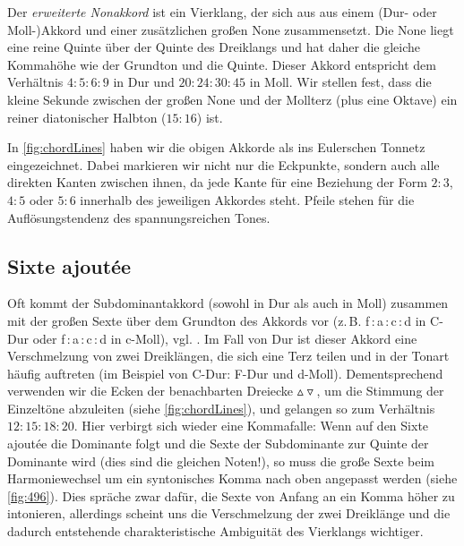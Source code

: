 Der \emph{erweiterte Nonakkord} ist ein Vierklang, der sich aus aus einem (Dur-
oder Moll-)Akkord und einer zusätzlichen großen None zusammensetzt.  Die None
liegt eine reine Quinte über der Quinte des Dreiklangs und hat daher die gleiche
Kommahöhe wie der Grundton und die Quinte. Dieser
Akkord entspricht dem Verhältnis $4:5:6:9$ in Dur und $20:24:30:45$ in Moll. Wir
stellen fest, dass die kleine Sekunde zwischen der großen None und der Mollterz
(plus eine Oktave) ein reiner diatonischer Halbton ($15:16$) ist.

In \cref{fig:chordLines} haben wir die obigen Akkorde als ins Eulerschen Tonnetz
eingezeichnet. Dabei markieren wir nicht nur die Eckpunkte, sondern auch alle
direkten Kanten zwischen ihnen, da jede Kante für eine Beziehung der Form $2:3$,
$4:5$ oder $5:6$ innerhalb des jeweiligen Akkordes steht. Pfeile stehen für die
Auflösungstendenz des spannungsreichen Tones.

\subsection{Sixte ajoutée}
\label{sec:sixte}

Oft kommt der Subdominantakkord (sowohl in Dur als auch in Moll) zusammen mit
der großen Sexte über dem Grundton des Akkords vor (z.\,B. f\,:\,a\,:\,c\,:\,d
in C-Dur oder f\,:\,\flat a\,:\,c\,:\,d in c-Moll), vgl. \cite[{}9.3]{Skript}.
Im Fall von Dur ist dieser Akkord eine Verschmelzung von zwei Dreiklängen, die
sich eine Terz teilen und in der Tonart häufig auftreten (im Beispiel von C-Dur:
F-Dur und d-Moll). Dementsprechend verwenden wir die Ecken der benachbarten
Dreiecke \mbox{$\vartriangle\!\!\!\triangledown$}, um die Stimmung der
Einzeltöne abzuleiten (siehe \cref{fig:chordLines}), und gelangen so zum
Verhältnis $12:15:18:20$. Hier verbirgt sich wieder eine Kommafalle: Wenn auf
den Sixte ajoutée die Dominante folgt und die Sexte der Subdominante zur Quinte
der Dominante wird (dies sind die gleichen Noten!), so muss die große Sexte beim
Harmoniewechsel um ein syntonisches Komma nach oben angepasst werden (siehe
\cref{fig:496}).  Dies spräche zwar dafür, die Sexte von Anfang an ein Komma
höher zu intonieren, allerdings scheint uns die Verschmelzung der zwei
Dreiklänge und die dadurch entstehende charakteristische Ambiguität des
Vierklangs wichtiger.

